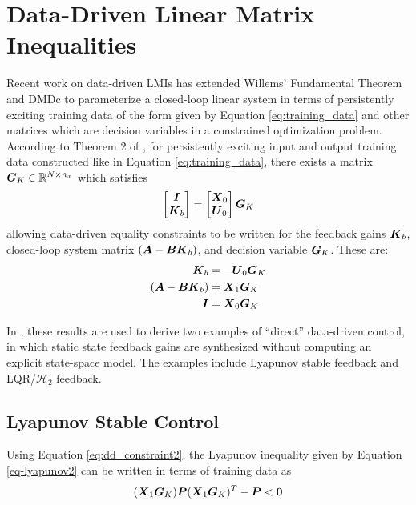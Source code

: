 \section{Data-Driven Linear Matrix Inequalities}
Recent work on data-driven LMIs has extended Willems' Fundamental Theorem and DMDc to parameterize a closed-loop linear system in terms of persistently exciting training data of the form given by Equation \eqref{eq:training_data} and other matrices which are decision variables in a constrained optimization problem.  According to Theorem 2 of \cite{de2019formulas}, for persistently exciting input and output training data constructed like in Equation \eqref{eq:training_data}, there exists a matrix $\vb*{G}_{K} \in \mathbb{R}^{N \times n_{x}}$ which satisfies
\begin{equation}
\begin{aligned}
	\begin{bmatrix} \vb*{I}\\ \vb*{K}_{b} \end{bmatrix} = \begin{bmatrix} \vb*{X}_{0}\\ \vb*{U}_{0} \end{bmatrix} \vb*{G}_{K}
\end{aligned} \label{data_driven_parameterization2}
\end{equation}
allowing data-driven equality constraints to be written for the feedback gains $\vb*{K}_{b}$, closed-loop system matrix $(\vb*{A} - \vb*{B}\vb*{K}_{b})$, and decision variable $\vb*{G}_{K}$.  These are:
\begin{subequations}
\label{eq:data_driven_constraints}
\begin{align}
	\vb*{K}_{b} &= -\vb*{U}_{0}\vb*{G}_{K} \label{eq:dd_constraint1}\\
	(\vb*{A} - \vb*{B}\vb*{K}_{b}) &= \vb*{X}_{1}\vb*{G}_{K} \label{eq:dd_constraint2}\\
	\vb*{I} &= \vb*{X}_{0}\vb*{G}_{K} \label{eq:dd_constraint3}
\end{align}
\end{subequations}

In \cite{de2019formulas}, these results are used to derive two examples of ``direct'' data-driven control, in which static state feedback gains are synthesized without computing an explicit state-space model.  The examples include Lyapunov stable feedback and LQR/$\mathcal{H}_{2}$ feedback.

\subsection{Lyapunov Stable Control}
\label{sect:dataDrivenLyapunov}
Using Equation \eqref{eq:dd_constraint2}, the Lyapunov inequality given by Equation \eqref{eq-lyapunov2} can be written in terms of training data as
\begin{equation}
\label{eq:lyapunov2_dd}
\begin{aligned}
	(\vb*{X}_{1}\vb*{G}_{K}) \vb*{P} (\vb*{X}_{1}\vb*{G}_{K})^{T} - \vb*{P} < \vb*{0}
\end{aligned}
\end{equation}

